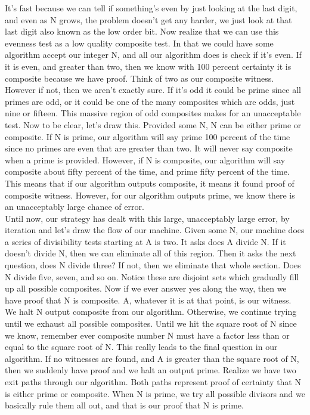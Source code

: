 \documentclass{report}
\begin{document}
It's fast because we can tell if something's even by just looking at the last digit, and even as N grows, the problem doesn't get any harder, we just look at that last digit also known as the low order bit. Now realize that we can use this evenness test as a low quality composite test. In that we could have some algorithm accept our integer N, and all our algorithm does is check if it's even. If it is even, and greater than two, then we know with 100 percent certainty it is composite because we have proof. Think of two as our composite witness. However if not, then we aren't exactly sure. If it's odd it could be prime since all primes are odd, or it could be one of the many composites which are odds, just nine or fifteen. This massive region of odd composites makes for an unacceptable test. Now to be clear, let's draw this. Provided some N, N can be either prime or composite. If N is prime, our algorithm will say prime 100 percent of the time since no primes are even that are greater than two. It will never say composite when a prime is provided. However, if N is composite, our algorithm will say composite about fifty percent of the time, and prime fifty percent of the time. This means that if our algorithm outputs composite, it means it found proof of composite witness. However, for our algorithm outputs prime, we know there is an unacceptably large chance of error. \\
Until now, our strategy has dealt with this large, unacceptably large error, by iteration and let's draw the flow of our machine. Given some N, our machine does a series of divisibility tests starting at A is two. It asks does A divide N. If it doesn't divide N, then we can eliminate all of this region. Then it asks the next question, does N divide three? If not, then we eliminate that whole section. Does N divide five, seven, and so on. Notice these are disjoint sets which gradually fill up all possible composites. Now if we ever answer yes along the way, then we have proof that N is composite. A, whatever it is at that point, is our witness. We halt N output composite from our algorithm. Otherwise, we continue trying until we exhaust all possible composites. Until we hit the square root of N since we know, remember ever composite number N must have a factor less than or equal to the square root of N. This really leads to the final question in our algorithm. If no witnesses are found, and A is greater than the square root of N, then we suddenly have proof and we halt an output prime. Realize we have two exit paths through our algorithm. Both paths represent proof of certainty that N is either prime or composite. When N is prime, we try all possible divisors and we basically rule them all out, and that is our proof that N is prime. \\
\end{document}
